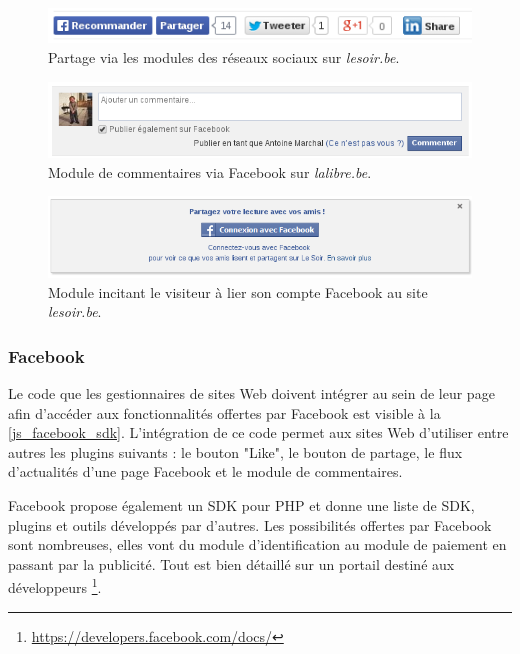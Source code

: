 \begin{figure}[h]
	\centering
	\includegraphics[scale=0.6]{figures/modules_sociaux_lesoir.png}
	\caption{Partage via les modules des réseaux sociaux sur \textit{lesoir.be}.}
\end{figure}

\begin{figure}[h]
	\centering
	\includegraphics[scale=0.6]{figures/module_facebook_lalibre.png}
	\caption{Module de commentaires via Facebook sur \textit{lalibre.be}.}
\end{figure}

\begin{figure}[h]
	\centering
	\includegraphics[scale=0.6]{figures/module_facebook_lesoir.png}
	\caption{Module incitant le visiteur à lier son compte Facebook au site \textit{lesoir.be}.}
\end{figure}

\subsubsection{Facebook}
Le code que les gestionnaires de sites Web doivent intégrer au sein de leur page afin d'accéder aux fonctionnalités offertes par Facebook \cite{javascript_facebook_sdk} est visible à la \autoref{js_facebook_sdk}. L'intégration de ce code permet aux sites Web d'utiliser entre autres les plugins suivants : le bouton "Like", le bouton de partage, le flux d'actualités d'une page Facebook et le module de commentaires.

Facebook propose également un SDK pour PHP et donne une liste de SDK, plugins et outils développés par d'autres. Les possibilités offertes par Facebook sont nombreuses, elles vont du module d'identification au module de paiement en passant par la publicité. Tout est bien détaillé sur un portail destiné aux développeurs \footnote{\url{https://developers.facebook.com/docs/}}.


